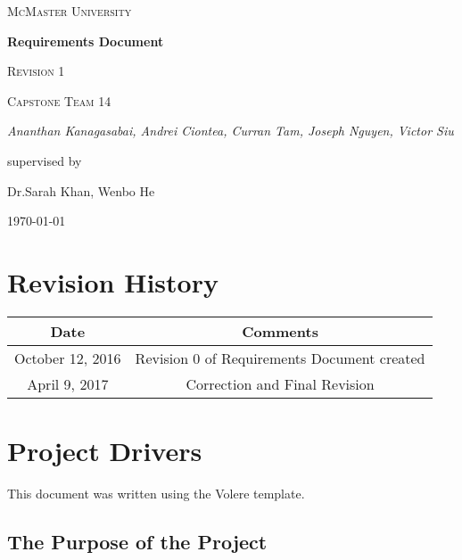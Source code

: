 \documentclass[12pt]{article}
\begin{document}
\begin{titlepage}
	\centering
	{\scshape\LARGE McMaster University \par}
	\vspace{1.5cm}
	{\huge\bfseries Requirements Document \par}
    {\scshape\Large Revision 1 \par}

	\vspace{1cm}
	{\scshape\Large Capstone Team 14\par}
	{\Large\itshape Ananthan Kanagasabai, Andrei Ciontea, Curran Tam, Joseph Nguyen, Victor Siu \par}
	\vspace{3cm}
	\vfill
	supervised by\par
	Dr.Sarah Khan, Wenbo He

	\vfill
	{\large \today\par}
\end{titlepage}

\newpage

\tableofcontents
\listoffigures
\listoftables

\newpage
\section*{Revision History}
\begin{tabular}{|c|c|}
\hline
\textbf{Date}  & \textbf{Comments} \\ \hline
October 12, 2016 & Revision 0 of Requirements Document created \\ 
\hline
April 9, 2017 & Correction and Final Revision\\
\hline
\end{tabular}

\newpage


\section{Project Drivers}
This document was written using the Volere template.

\subsection{The Purpose of the Project }
\end{document}
